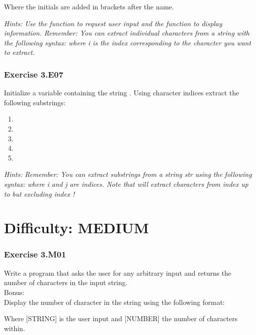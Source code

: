 \begin{center}
	{}
\end{center}

Where the initials are added in brackets after the name.


\textit{Hints:
Use the {} function to request user input and the {} function to display information. Remember: You can extract individual characters from a string with the
following syntax: {} where i is the index corresponding to the character you want to
extract.}\\[1cm]




\subsubsection*{Exercise 3.E07}
Initialize a variable containing the string {}. Using character indices extract the
following substrings:
\begin{enumerate}[label=(\alph*)]
	\item {}
	\item {}
	\item {}
	\item {}
	\item {}
\end{enumerate}

\textit{Hints:
Remember: You can extract substrings from a string str using the following syntax:
{} where i and j are indices. Note that {\code{[i:j]}} will extract characters from index {} up to but excluding index {}!}\\[1cm]



\newpage
\section{Difficulty: MEDIUM}

\subsubsection*{Exercise 3.M01}
Write a program that asks the user for any arbitrary input and returns the number of characters in the input string.\\
Bonus:\\
Display the number of character in the string using the following format:
\begin{center}
	{}
\end{center}
Where [STRING] is the user input and [NUMBER] the number of characters within.\\


